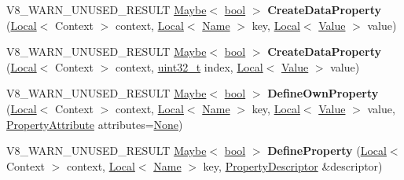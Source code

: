 \begin{DoxyCompactItemize}
V8\+\_\+\+W\+A\+R\+N\+\_\+\+U\+N\+U\+S\+E\+D\+\_\+\+R\+E\+S\+U\+LT \mbox{\hyperlink{classv8_1_1Maybe}{Maybe}}$<$ \mbox{\hyperlink{classbool}{bool}} $>$ {\bfseries Create\+Data\+Property} (\mbox{\hyperlink{classv8_1_1Local}{Local}}$<$ Context $>$ context, \mbox{\hyperlink{classv8_1_1Local}{Local}}$<$ \mbox{\hyperlink{classv8_1_1Name}{Name}} $>$ key, \mbox{\hyperlink{classv8_1_1Local}{Local}}$<$ \mbox{\hyperlink{classv8_1_1Value}{Value}} $>$ value)
\item 
\mbox{\label{classv8_1_1Object_a111334ca5a4101ea92030e6d40b909ea}} 
V8\+\_\+\+W\+A\+R\+N\+\_\+\+U\+N\+U\+S\+E\+D\+\_\+\+R\+E\+S\+U\+LT \mbox{\hyperlink{classv8_1_1Maybe}{Maybe}}$<$ \mbox{\hyperlink{classbool}{bool}} $>$ {\bfseries Create\+Data\+Property} (\mbox{\hyperlink{classv8_1_1Local}{Local}}$<$ Context $>$ context, \mbox{\hyperlink{classuint32__t}{uint32\+\_\+t}} index, \mbox{\hyperlink{classv8_1_1Local}{Local}}$<$ \mbox{\hyperlink{classv8_1_1Value}{Value}} $>$ value)
\item 
\mbox{\label{classv8_1_1Object_a38d88fed4393a0bfefcfa436e414f567}} 
V8\+\_\+\+W\+A\+R\+N\+\_\+\+U\+N\+U\+S\+E\+D\+\_\+\+R\+E\+S\+U\+LT \mbox{\hyperlink{classv8_1_1Maybe}{Maybe}}$<$ \mbox{\hyperlink{classbool}{bool}} $>$ {\bfseries Define\+Own\+Property} (\mbox{\hyperlink{classv8_1_1Local}{Local}}$<$ Context $>$ context, \mbox{\hyperlink{classv8_1_1Local}{Local}}$<$ \mbox{\hyperlink{classv8_1_1Name}{Name}} $>$ key, \mbox{\hyperlink{classv8_1_1Local}{Local}}$<$ \mbox{\hyperlink{classv8_1_1Value}{Value}} $>$ value, \mbox{\hyperlink{namespacev8_a05f25f935e108a1ea2d150e274602b87}{Property\+Attribute}} attributes=\mbox{\hyperlink{namespacev8_a05f25f935e108a1ea2d150e274602b87a7ab4d58719c33b3ea2dfaefa29b111df}{None}})
\item 
\mbox{\label{classv8_1_1Object_a2b51697185f63a1cd1d432363904f590}} 
V8\+\_\+\+W\+A\+R\+N\+\_\+\+U\+N\+U\+S\+E\+D\+\_\+\+R\+E\+S\+U\+LT \mbox{\hyperlink{classv8_1_1Maybe}{Maybe}}$<$ \mbox{\hyperlink{classbool}{bool}} $>$ {\bfseries Define\+Property} (\mbox{\hyperlink{classv8_1_1Local}{Local}}$<$ Context $>$ context, \mbox{\hyperlink{classv8_1_1Local}{Local}}$<$ \mbox{\hyperlink{classv8_1_1Name}{Name}} $>$ key, \mbox{\hyperlink{classv8_1_1PropertyDescriptor}{Property\+Descriptor}} \&descriptor)
\item 
\mbox{\label{classv8_1_1Object_a15c40cda73a1927bef406b85032d5564}} 

\end{DoxyCompactItemize}
